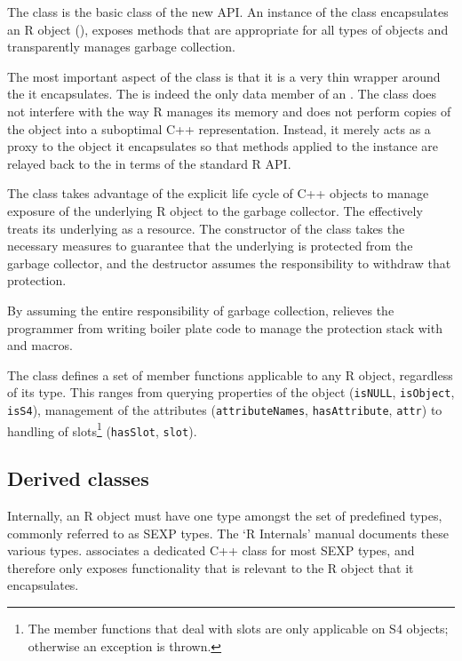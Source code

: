 The  class is the basic class of the new  API. 
An instance of the  class encapsulates an R object
(), exposes methods that are appropriate for all types 
of objects and transparently manages garbage collection.

The most important aspect of the  class is that it is 
a very thin wrapper around the  it encapsulates. The 
 is indeed the only data member of an . The 
 class does not interfere with the way R manages its 
memory and does not perform copies of the object into a suboptimal 
C++ representation. Instead, it merely acts as a proxy to the 
object it encapsulates so that methods applied to the 
instance are relayed back to the  in terms of the standard
R API.

The  class takes advantage of the explicit life cycle of 
C++ objects to manage exposure of the underlying R object to the 
garbage collector. The  effectively treats 
its underlying  as a resource.
The constructor of the  class takes 
the necessary measures to guarantee that the underlying 
is protected from the garbage collector, and the destructor
assumes the responsibility to withdraw that protection. 

By assuming the entire responsibility of garbage collection, 
relieves the programmer from writing boiler plate code to manage
the protection stack with  and  macros.

The  class defines a set of member functions applicable
to any R object, regardless of its type. This ranges from 
querying properties of the object (\texttt{isNULL}, \texttt{isObject}, 
\texttt{isS4}), management of the attributes 
(\texttt{attributeNames}, \texttt{hasAttribute}, \texttt{attr}) to 
handling of slots\footnote{The member functions that deal with slots
are only applicable on S4 objects; otherwise an exception is thrown.} 
(\texttt{hasSlot}, \texttt{slot}).

\subsection{Derived classes}

Internally, an R object must have one type amongst the set of 
predefined types, commonly referred to as SEXP types. The `R Internals'
manual \citep{R:ints} documents these various types. 
 associates a dedicated C++ class for most SEXP types, and
therefore only exposes functionality that is relevant to the R object
that it encapsulates.

